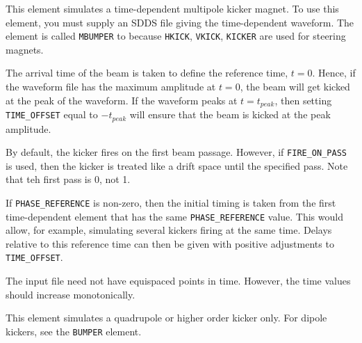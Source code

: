 This element simulates a time-dependent multipole kicker magnet.  To
use this element, you must supply an SDDS file giving the
time-dependent waveform.  The element is called {\tt MBUMPER} to
because {\tt HKICK}, {\tt VKICK}, {\tt KICKER} are used for steering
magnets.

The arrival time of the beam is taken to define the reference time,
$t=0$.  Hence, if the waveform file has the maximum amplitude at
$t=0$, the beam will get kicked at the peak of the waveform.  If the waveform
peaks at $t=t_{peak}$, then setting \verb|TIME_OFFSET| equal to $-t_{peak}$
will ensure that the beam is kicked at the peak amplitude.

By default, the kicker fires on the first beam passage.  However, if 
\verb|FIRE_ON_PASS| is used, then the kicker is treated like a drift space until
the specified pass.
Note that teh first pass is 0, not 1.

If \verb|PHASE_REFERENCE| is non-zero, then the initial timing is
taken from the first time-dependent element that has the same
\verb|PHASE_REFERENCE| value.  This would allow, for example,
simulating several kickers firing at the same time.  Delays relative
to this reference time can then be given with positive adjustments to
\verb|TIME_OFFSET|.

The input file need not have equispaced points in time.  However, the
time values should increase monotonically.

This element simulates a quadrupole or higher order kicker
only.  For dipole kickers, see the {\tt BUMPER} element.
